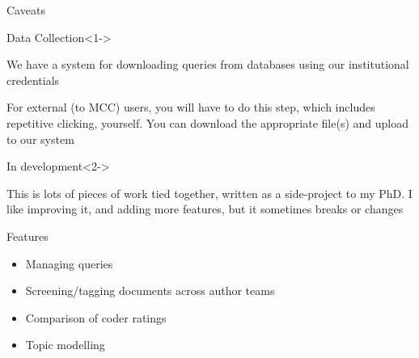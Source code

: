 \documentclass[9pt]{beamer}
\begin{document}
\begin{frame}{Caveats}

\begin{block}{Data Collection}<1->

We have a system for downloading queries from databases using our institutional credentials

For external (to MCC) users, you will have to do this step, which includes repetitive clicking, yourself. You can download the appropriate file(s) and upload to our system
\end{block}

\begin{block}{In development}<2->
	
	This is lots of pieces of work tied together, written as a side-project to my PhD. I like improving it, and adding more features, but it sometimes breaks or changes
	
\end{block}


\end{frame}

\begin{frame}{Features}

\begin{itemize}
	\item Managing queries
	\item Screening/tagging documents across author teams
	\item Comparison of coder ratings
	\item Topic modelling
\end{itemize}

\end{frame}

\end{document}
